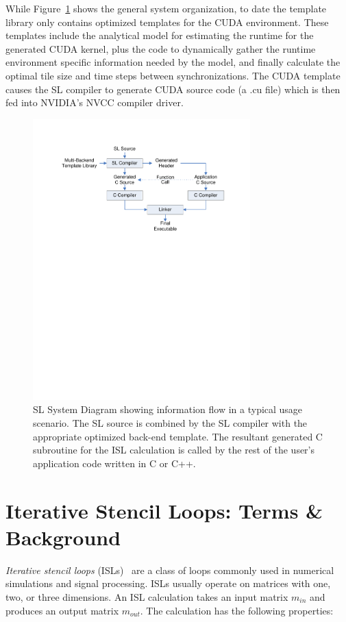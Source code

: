 \documentclass[preprint,nocopyrightspace]{styles/sigplanconf}
\begin{document}
While Figure~\ref{fig:SysOrg} shows the general system organization, to date
the template library only contains optimized templates for the CUDA
environment.  These templates include the analytical model for estimating the
runtime for the generated CUDA kernel, plus the code to dynamically
gather the runtime environment specific information needed by the model, and
finally calculate the optimal tile size and time steps between
synchronizations.
The CUDA template causes the SL compiler to generate CUDA source
code (a .cu file) which is then fed into NVIDIA's NVCC compiler driver.

\begin{figure}
\includegraphics[clip,trim=1.0in 6.4in 1.0in 1.0in,width=3.3in]{figures/WorkFlow}
\caption{SL System Diagram showing information flow in a typical usage scenario.
The SL source is combined by the SL compiler with the appropriate optimized back-end
template. The resultant generated C subroutine for the ISL calculation
is called by the rest of the user's application code written in C or C++.}
\label{fig:SysOrg}
\end{figure}

\section{Iterative Stencil Loops: Terms \& Background}

{\em Iterative stencil loops} (ISLs)~\cite{li} are a class of loops
commonly used in numerical simulations and
signal processing.  ISLs usually operate on matrices with one, two, or
three dimensions.  An ISL calculation takes an input matrix $m_{in}$
and produces an output matrix $m_{out}$.  The calculation has the
following properties:
\end{document}
